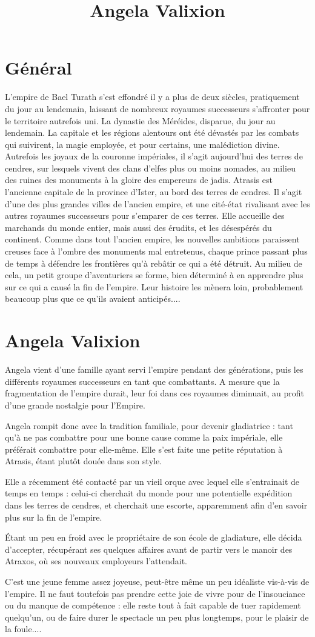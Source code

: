 \documentclass[10pt,a4paper]{article}
\author{ }
\title{Angela Valixion}
\begin{document}
\section{Général}
L'empire de Bael Turath s'est effondré il y a plus de deux siècles, pratiquement du jour au lendemain, laissant de nombreux royaumes successeurs s'affronter pour le territoire autrefois uni. La dynastie des Méréides, disparue, du jour au lendemain. La capitale et les régions alentours ont été dévastés par les combats qui suivirent, la magie employée, et pour certains, une malédiction divine. Autrefois les joyaux de la couronne impériales, il s'agit aujourd'hui des terres de cendres, sur lesquels vivent des clans d'elfes plus ou moins nomades, au milieu des ruines des monuments à la gloire des empereurs de jadis.
Atrasis est l'ancienne capitale de la province d'Ister, au bord des terres de cendres. Il s'agit d'une des plus grandes villes de l'ancien empire, et une cité-état rivalisant avec les autres royaumes successeurs pour s'emparer de ces terres. Elle accueille des marchands du monde entier, mais aussi des érudits, et les désespérés du continent.
Comme dans tout l'ancien empire, les nouvelles ambitions paraissent creuses face à l'ombre des monuments mal entretenus, chaque prince passant plus de temps à défendre les frontières qu'à rebâtir ce qui a été détruit.
Au milieu de cela, un petit groupe d'aventuriers se forme, bien déterminé à en apprendre plus sur ce qui a causé la fin de l'empire. Leur histoire les mènera loin, probablement beaucoup plus que ce qu'ils avaient anticipés....
\section{Angela Valixion}
Angela vient d'une famille ayant servi l'empire pendant des générations, puis les différents royaumes successeurs en tant que combattants. A mesure que la fragmentation de l'empire durait, leur foi dans ces royaumes diminuait, au profit d'une grande nostalgie pour l'Empire.

Angela rompit donc avec la tradition familiale, pour devenir gladiatrice : tant qu'à ne pas combattre pour une bonne cause comme la paix impériale, elle préférait combattre pour elle-même. Elle s'est faite une petite réputation à Atrasis, étant plutôt douée dans son style.

Elle a récemment été contacté par un vieil orque avec lequel elle s'entrainait de temps en temps : celui-ci cherchait du monde pour une potentielle expédition dans les terres de cendres, et cherchait une escorte, apparemment afin d'en savoir plus sur la fin de l'empire. 

Étant un peu en froid avec le propriétaire de son école de gladiature, elle décida d'accepter, récupérant ses quelques affaires avant de partir vers le manoir des Atraxos, où ses nouveaux employeurs l'attendait.

C'est une jeune femme assez joyeuse, peut-être même un peu idéaliste vis-à-vis de l'empire. Il ne faut toutefois pas prendre cette joie de vivre pour de l'insouciance ou du manque de compétence : elle reste tout à fait capable de tuer rapidement quelqu'un, ou de faire durer le spectacle un peu plus longtemps, pour le plaisir de la foule....
\end{document}
